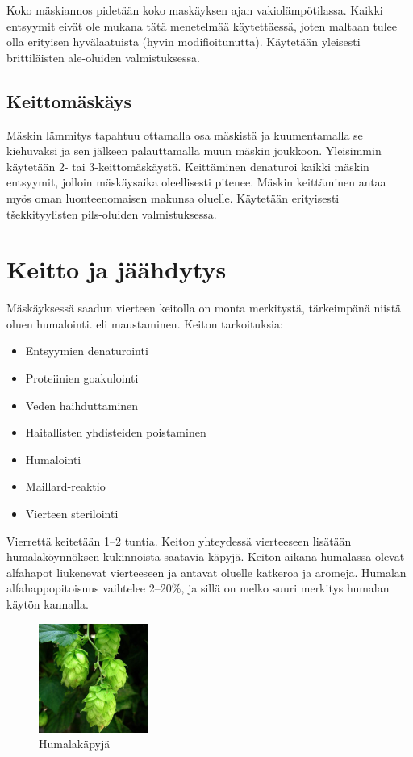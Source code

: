 \documentclass[a4paper,11pt]{report}
\begin{document}
Koko mäskiannos pidetään koko maskäyksen ajan vakiolämpötilassa. Kaikki entsyymit eivät ole mukana tätä menetelmää käytettäessä, joten maltaan tulee olla erityisen hyvälaatuista (hyvin modifioitunutta). Käytetään yleisesti brittiläisten ale-oluiden valmistuksessa.

\subsection{Keittomäskäys}

Mäskin lämmitys tapahtuu ottamalla osa mäskistä ja kuumentamalla se kiehuvaksi ja sen jälkeen palauttamalla muun mäskin joukkoon. Yleisimmin käytetään 2- tai 3-keittomäskäystä. Keittäminen denaturoi kaikki mäskin entsyymit, jolloin mäskäysaika oleellisesti pitenee. Mäskin keittäminen antaa myös oman luonteenomaisen makunsa oluelle. Käytetään erityisesti tšekkityylisten pils-oluiden valmistuksessa.

\section{Keitto ja jäähdytys}

Mäskäyksessä saadun vierteen keitolla on monta merkitystä, tärkeimpänä niistä oluen humalointi. eli maustaminen. Keiton tarkoituksia:
\begin{itemize}
\item Entsyymien denaturointi
\item Proteiinien goakulointi
\item Veden haihduttaminen
\item Haitallisten yhdisteiden poistaminen
\item Humalointi
\item Maillard-reaktio
\item Vierteen sterilointi
\end{itemize}

Vierrettä keitetään 1--2 tuntia. Keiton yhteydessä vierteeseen lisätään humalaköynnöksen kukinnoista saatavia käpyjä. Keiton aikana humalassa olevat alfahapot liukenevat vierteeseen ja antavat oluelle katkeroa ja aromeja. Humalan alfahappopitoisuus vaihtelee 2--20\%, ja sillä on melko suuri merkitys humalan käytön kannalla.

\begin{figure}
  \begin{center}
    \includegraphics[width=0.32\textwidth]{hops}
    \caption{Humalakäpyjä}
  \end{center}
  \end{figure}
\end{document}
